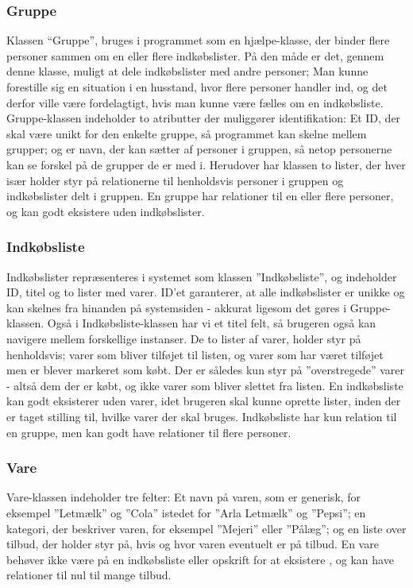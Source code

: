 \subsubsection{Gruppe}
Klassen ``Gruppe'', bruges i programmet som en hjælpe-klasse, der binder flere personer sammen om en eller flere indkøbslister.
På den måde er det, gennem denne klasse, muligt at dele indkøbslister med andre personer;
Man kunne forestille sig en situation i en husstand, hvor flere personer handler ind, og det derfor ville være fordelagtigt, hvis man kunne være fælles om en indkøbsliste.
Gruppe-klassen indeholder to atributter der muliggører identifikation: Et ID, der skal være unikt for den enkelte gruppe, så programmet kan skelne mellem grupper; og er navn, der kan sætter af personer i gruppen, så netop personerne kan se forskel på de grupper de er med i.
Herudover har klassen to lister, der hver især holder styr på relationerne til henholdsvis personer i gruppen og indkøbslister delt i gruppen.
En gruppe har relationer til en eller flere personer, og kan godt eksistere uden indkøbslister.

\subsubsection{Indkøbsliste}
Indkøbslister repræsenteres i systemet som klassen ''Indkøbsliste'', og indeholder ID, titel og to lister med varer.
ID'et garanterer, at alle indkøbslister er unikke og kan skelnes fra hinanden på systemsiden - akkurat ligesom det gøres i Gruppe-klassen.
Også i Indkøbsliste-klassen har vi et titel felt, så brugeren også kan navigere mellem forskellige instanser.
De to lister af varer, holder styr på henholdsvis; varer som bliver tilføjet til listen, og varer som har været tilføjet men er blever markeret som købt.
Der er således kun styr på ''overstregede'' varer - altså dem der er købt, og ikke varer som bliver slettet fra listen.
En indkøbsliste kan godt eksisterer uden varer, idet brugeren skal kunne oprette lister, inden der er taget stilling til, hvilke varer der skal bruges.
Indkøbsliste har kun relation til en gruppe, men kan godt have relationer til flere personer.

\subsubsection{Vare}
Vare-klassen indeholder tre felter: Et navn på varen, som er generisk, for eksempel ''Letmælk'' og ''Cola'' istedet for ''Arla Letmælk'' og ''Pepsi''; en kategori, der beskriver varen, for eksempel ''Mejeri'' eller ''Pålæg''; og en liste over tilbud, der holder styr på, hvis og hvor varen eventuelt er på tilbud.
En vare behøver ikke være på en indkøbsliste eller opskrift for at eksistere , og kan have relationer til nul til mange tilbud.

